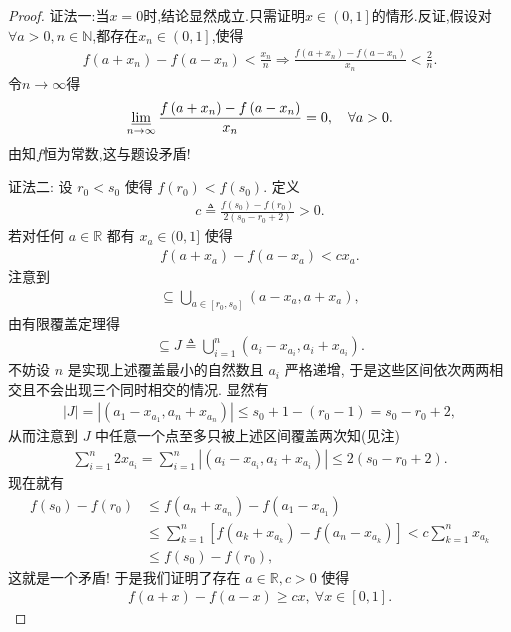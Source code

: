 \documentclass[../../main.tex]{subfiles}%
\begin{document}
\begin{proof}

{\color{blue}证法一:}当$x=0$时,结论显然成立.只需证明$x\in \left( 0,1 \right]$的情形.反证,假设对$\forall a>0,n\in \mathbb{N}$,都存在$x_n\in \left( 0,1 \right]$,使得
\begin{align*}
f\left( a+x_n \right) -f\left( a-x_n \right) <\frac{x_n}{n}\Longrightarrow \frac{f\left( a+x_n \right) -f\left( a-x_n \right)}{x_n}<\frac{2}{n}.
\end{align*}
令$n\rightarrow \infty$得
\begin{align*}
\varliminf\limits_{n\rightarrow \infty}\frac{f\left( a+x_n \right) -f\left( a-x_n \right)}{x_n}=0,\quad \forall a>0.
\end{align*}
由知$f$恒为常数,这与题设矛盾!

{\color{blue}证法二:}
设 $r_0 < s_0$ 使得 $f(r_0) < f(s_0)$. 定义
\begin{align*}
c \triangleq \frac{f(s_0) - f(r_0)}{2(s_0 - r_0 + 2)} > 0.
\end{align*}
若对任何 $a \in \mathbb{R}$ 都有 $x_a \in (0,1]$ 使得
\begin{align*}
f(a + x_a) - f(a - x_a) < c x_a.
\end{align*}
注意到
\begin{align*}
[r_0, s_0] \subseteq \bigcup_{a \in [r_0, s_0]} (a - x_a, a + x_a),
\end{align*}
由有限覆盖定理得
\begin{align*}
[r_0, s_0] \subseteq J \triangleq \bigcup_{i=1}^n (a_i - x_{a_i}, a_i + x_{a_i}).
\end{align*}
不妨设 $n$ 是实现上述覆盖最小的自然数且 $a_i$ 严格递增, 于是这些区间依次两两相交且不会出现三个同时相交的情况. 显然有
\begin{align*}
|J| = |(a_1 - x_{a_1}, a_n + x_{a_n})| \leqslant s_0 + 1 - (r_0 - 1) = s_0 - r_0 + 2,
\end{align*}
从而注意到 $J$ 中任意一个点至多只被上述区间覆盖两次知(见注)
\begin{align*}
\sum_{i=1}^n 2x_{a_i} = \sum_{i=1}^n |(a_i - x_{a_i}, a_i + x_{a_i})| \leqslant 2(s_0 - r_0 + 2).
\end{align*}
现在就有
\begin{align*}
f(s_0) - f(r_0) &\leqslant f(a_n + x_{a_n}) - f(a_1 - x_{a_1}) \\
&\leqslant \sum_{k=1}^n \left[f(a_k + x_{a_k}) - f(a_n - x_{a_k})\right] < c \sum_{k=1}^n x_{a_k} \\
&\leqslant f(s_0) - f(r_0),
\end{align*}
这就是一个矛盾! 于是我们证明了存在 $a \in \mathbb{R}, c > 0$ 使得
\begin{align*}
f(a + x) - f(a - x) \geqslant c x, \ \forall x \in [0, 1].
\end{align*}
\end{proof}
\end{document}
